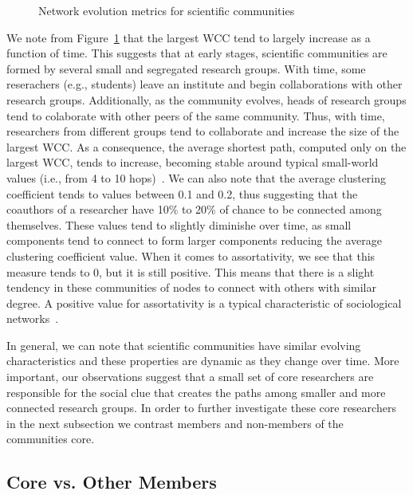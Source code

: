 \begin{figure}[!htpb]
\begin{center}
{  }%
  \end{center}
  \caption{Network evolution metrics for scientific communities}
  \label{fig:metrics}
\end{figure}

We note from Figure~\ref{fig:metrics} that the largest WCC tend to largely increase as a function of time. This suggests that at early
stages, scientific communities are formed by several small and segregated research groups. With time, some reserachers (e.g., students) leave an institute and begin collaborations
with other research groups. Additionally, as the community evolves, heads of  research groups tend to colaborate with other peers of the same community. Thus, with time, researchers
from different groups tend to collaborate and increase the size of the largest WCC. As a consequence, the average shortest path, computed only on the largest
WCC, tends to increase, becoming stable around typical small-world values (i.e., from 4 to 10 hops)~\cite{mislove-2007-socialnetworks,fourdegrees_facebook}.  We can
also note that the average clustering coefficient tends to values between 0.1 and 0.2, thus suggesting that the coauthors of a researcher have 10\% to 20\% of chance to be connected
among themselves. These values tend to slightly diminishe over time, as small components tend to connect to form larger components reducing the average clustering coefficient
value.  When it comes to assortativity, we see that this measure tends to 0, but it is still positive. This means that there is a slight tendency in these communities of nodes to
connect with others with similar degree.  A positive value for assortativity is a typical characteristic of sociological networks~\cite{Newman2003}.

In general, we can note that scientific communities have similar evolving characteristics and these properties are dynamic as they change over time.  More important, our
observations suggest that a small set of core researchers are responsible for the social clue that creates the paths among smaller and more connected research groups. In order to 
further investigate these core researchers in the next subsection we contrast members and non-members of the communities core. 







\subsection{Core vs. Other Members}
\label{sub:vs}

